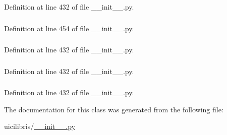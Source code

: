 \-Definition at line 432 of file \-\_\-\-\_\-init\-\_\-\-\_\-.\-py.

\hypertarget{classuicilibris_1_1latexComp_ad99271f86b470be24fedfdddd728374d}{
\subsubsection[{log\-Output}]{}}\label{classuicilibris_1_1latexComp_ad99271f86b470be24fedfdddd728374d}


\-Definition at line 454 of file \-\_\-\-\_\-init\-\_\-\-\_\-.\-py.

\hypertarget{classuicilibris_1_1latexComp_a0b4666c9c550dcb6d7e34f83650efd09}{
\subsubsection[{pdf\-File\-Name}]{}}\label{classuicilibris_1_1latexComp_a0b4666c9c550dcb6d7e34f83650efd09}


\-Definition at line 432 of file \-\_\-\-\_\-init\-\_\-\-\_\-.\-py.

\hypertarget{classuicilibris_1_1latexComp_ac4c4c87e8652870b3f427348f00b054c}{
\subsubsection[{tex\-Filename}]{}}\label{classuicilibris_1_1latexComp_ac4c4c87e8652870b3f427348f00b054c}


\-Definition at line 432 of file \-\_\-\-\_\-init\-\_\-\-\_\-.\-py.

\hypertarget{classuicilibris_1_1latexComp_a5b5d686a0230cb74c85c8ed2b8f2a60d}{
\subsubsection[{tmpdir}]{}}\label{classuicilibris_1_1latexComp_a5b5d686a0230cb74c85c8ed2b8f2a60d}


\-Definition at line 432 of file \-\_\-\-\_\-init\-\_\-\-\_\-.\-py.



\-The documentation for this class was generated from the following file\-:\begin{DoxyCompactItemize}
\item 
uicilibris/\hyperlink{____init_____8py}{\-\_\-\-\_\-init\-\_\-\-\_\-.\-py}\end{DoxyCompactItemize}
